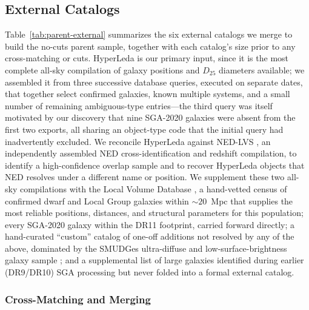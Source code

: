 \documentclass[modern,linenumbers]{aastex701}
\begin{document}
\subsection{External Catalogs}
\label{sec:input:parent:external}

Table~\ref{tab:parent-external} summarizes the six external catalogs we
merge to build the no-cuts parent sample, together with each catalog's
size prior to any cross-matching or cuts. HyperLeda \citep{makarov14a}
is our primary input, since it is the most complete all-sky compilation
of galaxy positions and $D_{25}$ diameters available; we assembled it
from three successive database queries, executed on separate dates,
that together select confirmed galaxies, known multiple systems, and a
small number of remaining ambiguous-type entries---the third query
was itself motivated by our discovery that nine SGA-2020 galaxies were
absent from the first two exports, all sharing an object-type code that
the initial query had inadvertently excluded. We reconcile HyperLeda
against NED-LVS \citep[NED Local Volume Sample;][]{cook23a}, an
independently assembled NED cross-identification and redshift
compilation, to identify a high-confidence overlap sample and to recover
HyperLeda objects that NED resolves under a different name or position.
We supplement these two all-sky compilations with the Local Volume
Database \citep[LVD;][]{pace25a}, a hand-vetted census of confirmed
dwarf and Local Group galaxies within $\sim\!20$~Mpc that supplies the
most reliable positions, distances, and structural parameters for this
population; every SGA-2020 galaxy \citep{moustakas23a} within the DR11
footprint, carried forward directly; a hand-curated ``custom'' catalog
of one-off additions not resolved by any of the above, dominated by the
SMUDGes ultra-diffuse and low-surface-brightness galaxy sample
\citep{zaritsky23a}; and a supplemental list of large galaxies
identified during earlier (DR9/DR10) SGA processing but never folded
into a formal external catalog.



\subsubsection{Cross-Matching and Merging}
\label{sec:input:parent:merge}
\end{document}
